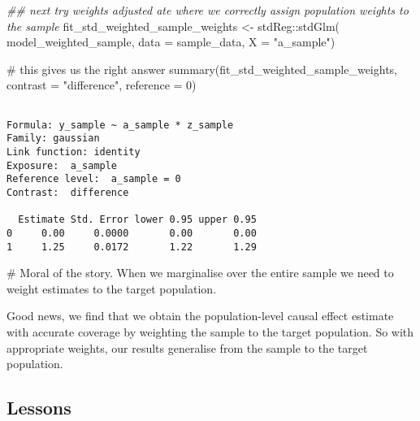 \documentclass[
  singlecolumn]{article}
\newenvironment{Shaded}{\begin{snugshade}}{\end{snugshade}}
\newcommand{\AttributeTok}[1]{\textcolor[rgb]{0.40,0.45,0.13}{#1}}
\newcommand{\CommentTok}[1]{\textcolor[rgb]{0.37,0.37,0.37}{#1}}
\newcommand{\DecValTok}[1]{\textcolor[rgb]{0.68,0.00,0.00}{#1}}
\newcommand{\DocumentationTok}[1]{\textcolor[rgb]{0.37,0.37,0.37}{\textit{#1}}}
\newcommand{\FunctionTok}[1]{\textcolor[rgb]{0.28,0.35,0.67}{#1}}
\newcommand{\NormalTok}[1]{\textcolor[rgb]{0.00,0.23,0.31}{#1}}
\newcommand{\OtherTok}[1]{\textcolor[rgb]{0.00,0.23,0.31}{#1}}
\newcommand{\SpecialCharTok}[1]{\textcolor[rgb]{0.37,0.37,0.37}{#1}}
\newcommand{\StringTok}[1]{\textcolor[rgb]{0.13,0.47,0.30}{#1}}
\begin{document}
\begin{Shaded}
\begin{Highlighting}[]
\DocumentationTok{\#\# next try weights adjusted ate where we correctly assign population weights to the sample}
\NormalTok{fit\_std\_weighted\_sample\_weights }\OtherTok{\textless{}{-}}\NormalTok{ stdReg}\SpecialCharTok{::}\FunctionTok{stdGlm}\NormalTok{( model\_weighted\_sample, }
    \AttributeTok{data =}\NormalTok{ sample\_data, }
    \AttributeTok{X =} \StringTok{"a\_sample"}\NormalTok{)}

\CommentTok{\# this gives us the right answer}
\FunctionTok{summary}\NormalTok{(fit\_std\_weighted\_sample\_weights, }
    \AttributeTok{contrast =} \StringTok{"difference"}\NormalTok{, }
    \AttributeTok{reference =} \DecValTok{0}\NormalTok{)}
\end{Highlighting}
\end{Shaded}

\begin{verbatim}

Formula: y_sample ~ a_sample * z_sample
Family: gaussian 
Link function: identity 
Exposure:  a_sample 
Reference level:  a_sample = 0 
Contrast:  difference 

  Estimate Std. Error lower 0.95 upper 0.95
0     0.00     0.0000       0.00       0.00
1     1.25     0.0172       1.22       1.29
\end{verbatim}

\begin{Shaded}
\begin{Highlighting}[]
\CommentTok{\# Moral of the story. When we marginalise over the entire sample we need to weight estimates to the target population. }
\end{Highlighting}
\end{Shaded}

Good news, we find that we obtain the population-level causal effect
estimate with accurate coverage by weighting the sample to the target
population. So with appropriate weights, our results generalise from the
sample to the target population.

\subsection{Lessons}\label{lessons}
\end{document}
